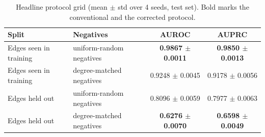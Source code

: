\begin{table}[h!]
\caption{Headline protocol grid (mean $\pm$ std over 4 seeds, test set). Bold marks the conventional and the corrected protocol.}
\label{tab:headline_grid}
\small
\begin{tabular}{llcc}
\hline
Split & Negatives & AUROC & AUPRC \\
\hline
Edges seen in training & uniform-random negatives & \textbf{0.9867 $\pm$ 0.0011} & \textbf{0.9850 $\pm$ 0.0013} \\
Edges seen in training & degree-matched negatives & 0.9248 $\pm$ 0.0045 & 0.9178 $\pm$ 0.0056 \\
Edges held out & uniform-random negatives & 0.8096 $\pm$ 0.0059 & 0.7977 $\pm$ 0.0063 \\
Edges held out & degree-matched negatives & \textbf{0.6276 $\pm$ 0.0070} & \textbf{0.6598 $\pm$ 0.0049} \\
\hline
\end{tabular}
\end{table}
